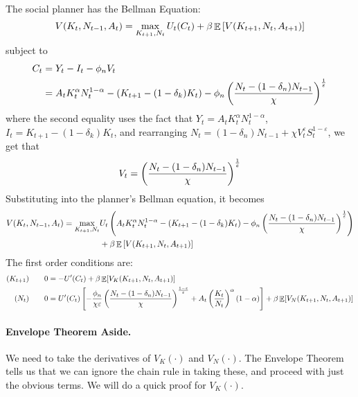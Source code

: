 \documentclass[10pt]{article}
\begin{document}
\begin{model}
	 The social planner has the Bellman Equation:
	\[
	V(K_t,N_{t-1},A_t) = \max_{K_{t+1},N_t} U_t(C_t) + \beta \mathop{\mathbb{E}} \left[ V(K_{t+1},N_t,A_{t+1}) \right]
	\]
	subject to
	\begin{align*}
		C_t &= Y_t - I_t - \phi_n V_t \\
		&= A_tK_t^\alpha N_t^{1-\alpha} - (K_{t+1} - (1-\delta_k)K_t) - \phi_n \left( \frac{N_t - (1-\delta_n)N_{t-1}}{\chi}\right)^\frac{1}{\varepsilon}
	\end{align*}
	where the second equality uses the fact that $Y_t = A_tK_t^\alpha N_t^{1-\alpha}$, $I_t = K_{t+1} - (1-\delta_k)K_t$, and rearranging $N_t = (1-\delta_n)N_{t-1} + \chi V_t^\varepsilon S_t^{1-\varepsilon}$, we get that
	\[
	V_t = \left( \frac{N_t - (1-\delta_n)N_{t-1}}{\chi}\right)^\frac{1}{\varepsilon}
	\]
	Substituting into the planner's Bellman equation, it becomes
	\begin{align*}
		V(K_t,N_{t-1},A_t) = \max_{K_{t+1},N_t} &U_t\left( A_tK_t^\alpha N_t^{1-\alpha} - (K_{t+1} - (1-\delta_k)K_t) - \phi_n \left( \frac{N_t - (1-\delta_n)N_{t-1}}{\chi}\right)^\frac{1}{\varepsilon}\right) \\
		&+ \beta \mathop{\mathbb{E}} \left[ V(K_{t+1},N_t,A_{t+1}) \right]
	\end{align*}
	The first order conditions are:
	\begin{align*}
		(K_{t+1})\qquad 0 &= -U'(C_t) + \beta \mathop{\mathbb{E}}[V_K(K_{t+1},N_t,A_{t+1}) ] \\
		(N_t) \qquad 0 &= U'(C_t)\left[ - \frac{\phi_n}{\chi \varepsilon}\left( \frac{N_t - (1-\delta_n)N_{t-1}}{\chi}\right)^{\frac{1-\varepsilon}{\varepsilon}} + A_t \left( \frac{K_t}{N_t}\right)^\alpha (1-\alpha) \right] + \beta \mathop{\mathbb{E}}[V_N(K_{t+1},N_t,A_{t+1}) ]
	\end{align*}
\end{model}

\paragraph{Envelope Theorem Aside.}

We need to take the derivatives of $V_K(\cdot)$ and $V_N(\cdot)$. The Envelope Theorem tells us that we can ignore the chain rule in taking these, and proceed with just the obvious terms. We will do a quick proof for $V_K(\cdot)$.
\end{document}

